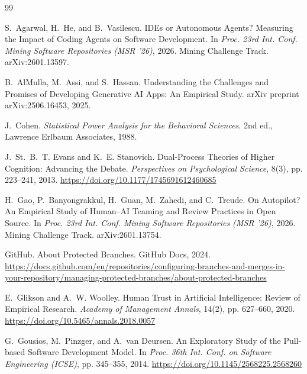 \documentclass[sigconf]{acmart}
\begin{document}
\balance

\begin{thebibliography}{99}

S.~Agarwal, H.~He, and B.~Vasilescu.
 {IDEs} or Autonomous Agents? Measuring the Impact of Coding Agents on Software Development.
\newblock In \emph{Proc. 23rd Int. Conf. Mining Software Repositories (MSR '26)}, 2026. Mining Challenge Track. arXiv:2601.13597.

B.~AlMulla, M.~Assi, and S.~Hassan.
\newblock Understanding the Challenges and Promises of Developing Generative {AI} Apps: An Empirical Study.
\newblock arXiv preprint arXiv:2506.16453, 2025.

J.~Cohen.
\newblock \emph{Statistical Power Analysis for the Behavioral Sciences}.
\newblock 2nd ed., Lawrence Erlbaum Associates, 1988.

J.~St.~B.~T. Evans and K.~E. Stanovich.
\newblock Dual-Process Theories of Higher Cognition: Advancing the Debate.
\newblock \emph{Perspectives on Psychological Science}, 8(3), pp. 223--241, 2013. \url{https://doi.org/10.1177/1745691612460685}

H.~Gao, P.~Banyongrakkul, H.~Guan, M.~Zahedi, and C.~Treude.
\newblock On Autopilot? An Empirical Study of Human--{AI} Teaming and Review Practices in Open Source.
\newblock In \emph{Proc. 23rd Int. Conf. Mining Software Repositories (MSR '26)}, 2026. Mining Challenge Track. arXiv:2601.13754.

GitHub.
\newblock About Protected Branches.
\newblock GitHub Docs, 2024. \url{https://docs.github.com/en/repositories/configuring-branches-and-merges-in-your-repository/managing-protected-branches/about-protected-branches}

E.~Glikson and A.~W. Woolley.
\newblock Human Trust in Artificial Intelligence: Review of Empirical Research.
\newblock \emph{Academy of Management Annals}, 14(2), pp. 627--660, 2020. \url{https://doi.org/10.5465/annals.2018.0057}

G.~Gousios, M.~Pinzger, and A.~van Deursen.
\newblock An Exploratory Study of the Pull-based Software Development Model.
\newblock In \emph{Proc. 36th Int. Conf. on Software Engineering (ICSE)}, pp. 345--355, 2014.
\newblock \url{https://doi.org/10.1145/2568225.2568260}


\end{thebibliography}
\end{document}
